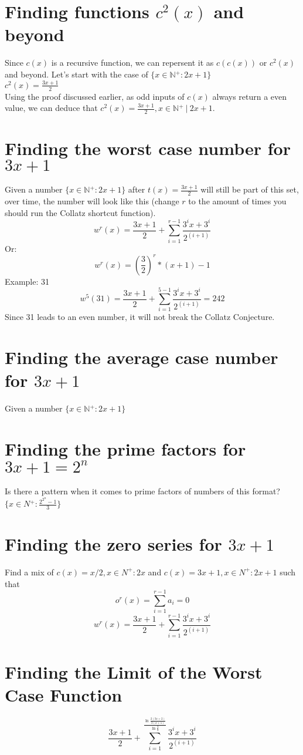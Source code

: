 \documentclass[a4paper,10pt]{article}
\begin{document}
  \section{Finding functions $c{^2}(x)$ and beyond}
  Since $c(x)$ is a recursive function, we can repersent it as $c(c(x))$ or $c{^2}(x)$ and beyond.
  Let's start with the case of \(\{x \in \mathbb{N{^+}} : 2x+1\}\) \\
  \(c^2(x) = \frac{3x+1}{2}\) \\
  Using the proof discussed earlier, as odd inputs of \(c(x)\) always return a even value, we can deduce that \(c^2(x) = \frac{3x+1}{2}, x \in \mathbb{N{^+}} \ | \ 2x+1\).
  \section{Finding the worst case number for $3x+1$}
  Given a number \(\{x \in \mathbb{N{^+}}: 2x + 1\}\) after \(t(x) = \frac{3x+1}{2}\) will still be part of this set, over time, the number will look like this (change $r$ to the amount of times you should run the Collatz shortcut function).
  \[
    w^{r}(x) = \frac{3x+1}{2}+\sum_{i=1}^{r-1} \frac{3^{i}x+3^{i}}{2^{(i+1)}}
  \]
  Or:
  \[
    w^{r}(x) = \left(\frac{3}{2}\right)^{r}*(x+1)-1
  \]
  Example: 31
  \[
     w^{5}(31) = \frac{3x+1}{2}+\sum_{i=1}^{5-1} \frac{3^{i}x+3^{i}}{2^{(i+1)}} = 242
  \]
  Since 31 leads to an even number, it will not break the Collatz Conjecture.
  \section{Finding the average case number for $3x+1$}
  Given a number \(\{x \in \mathbb{N{^+}}: 2x + 1\}\)
  \section{Finding the prime factors  for $3x+1=2^n$}
  Is there a pattern when it comes to prime factors of numbers of this format?
  \(\{x \in N{^+} : \frac{2^{2^{n}}-1}{3}\}\)
  \section{Finding the zero series for $3x+1$}
  Find a mix of $c(x) = x/2, x \in N^{+} : 2x$ and $c(x) = 3x+1, x \in N^{+} : 2x + 1$ such that
  \[o^{r}(x) = \sum_{i=1}^{r-1} a_i = 0\]
  \[w^{r}(x) = \frac{3x+1}{2}+\sum_{i=1}^{r-1} \frac{3^{i}x+3^{i}}{2^{(i+1)}}\]
  \section{Finding the Limit of the Worst Case Function}
  \[
    \frac{3x+1}{2}+\sum_{i=1}^{\frac{\ln{\frac{2(3x+2)}{3(x+1)}}}{\ln{\frac{3}{2}}}} \frac{3^{i}x+3^{i}}{2^{(i+1)}}
  \]
\end{document}
